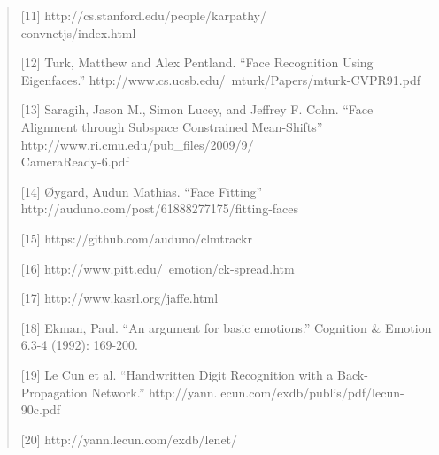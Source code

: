 \documentclass[10pt,twocolumn,letterpaper]{article}
\begin{document}
\begin{quote}
[11] http://cs.stanford.edu/people/karpathy/ \\ convnetjs/index.html

[12] Turk, Matthew and Alex Pentland. ``Face Recognition Using Eigenfaces.'' http://www.cs.ucsb.edu/~mturk/Papers/mturk-CVPR91.pdf

[13] Saragih, Jason M., Simon Lucey, and Jeffrey F. Cohn. ``Face Alignment through Subspace Constrained Mean-Shifts'' http://www.ri.cmu.edu/pub\_files/2009/9/ \\ CameraReady-6.pdf

[14] \O ygard, Audun Mathias. ``Face Fitting'' http://auduno.com/post/61888277175/fitting-faces

[15] https://github.com/auduno/clmtrackr

[16] http://www.pitt.edu/~emotion/ck-spread.htm

[17] http://www.kasrl.org/jaffe.html

[18] Ekman, Paul. ``An argument for basic emotions.'' Cognition \& Emotion 6.3-4 (1992): 169-200.

[19] Le Cun et al. ``Handwritten Digit Recognition with a Back-Propagation Network.'' http://yann.lecun.com/exdb/publis/pdf/lecun-90c.pdf

[20] http://yann.lecun.com/exdb/lenet/
\end{quote}
\end{document}
